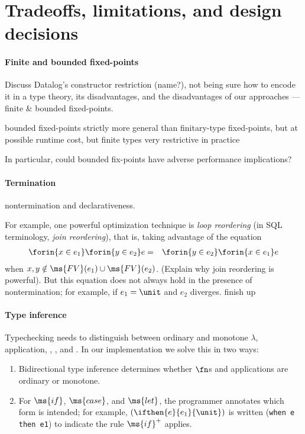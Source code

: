 \documentclass[preprint]{sigplanconf}
\begin{document}

\section{Tradeoffs, limitations, and design decisions}

\paragraph{Finite and bounded fixed-points} \TODO Discuss
Datalog's constructor restriction (name?), not being sure how to encode it in a
type theory, its disadvantages, and the disadvantages of our approaches ---
finite \& bounded fixed-points.

bounded fixed-points strictly more general than finitary-type fixed-points, but
at possible runtime cost, but finite types very restrictive in practice

\TODO In particular, could bounded fix-points have adverse performance
implications?

\paragraph{Termination} \TODO nontermination and declarativeness.

For example, one powerful optimization technique is \emph{loop reordering} (in
SQL terminology, \emph{join reordering}), that is, taking advantage of the
equation
\begin{eqnarray*}
  \forin{x \in e_1} \forin{y \in e_2} e
  &=& \forin{y \in e_2} \forin{x \in e_1} e
\end{eqnarray*}
when $x,y \notin \ms{FV}(e_1) \cup \ms{FV}(e_2)$. (\TODO Explain why join
reordering is powerful). But this equation does not always hold in the presence
of nontermination; for example, if $e_1 = \unit$ and $e_2$ diverges. \TODO
finish up

\paragraph{Type inference} Typechecking needs to distinguish between ordinary
and monotone $\lambda$, application, , , and . In our
implementation we solve this in two ways:
\begin{enumerate}
\item Bidirectional type inference  determines whether $\fn$s and
  applications are ordinary or monotone.
\item For $\ms{if}$, $\ms{case}$, and $\ms{let}$, the programmer annotates which
  form is intended; for example, $(\ifthen{e}{e_1}{\unit})$ is written
  (\texttt{when e then e1}) to indicate the rule $\ms{if}^+$ applies.
\end{enumerate}
\end{document}

